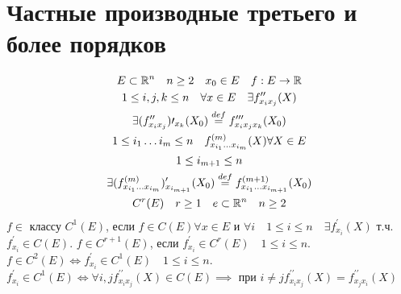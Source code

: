 \documentclass[main]{subfiles}
\begin{document}
\section{Частные производные третьего и более порядков}
\begin{gather*}
    E \subset \mathbb{R}^n \quad n \geq 2 \quad x_0 \in E \quad f: E \rightarrow \mathbb{R} \\
    1 \leq i,j,k \leq n \quad \forall x \in E \quad \exists f^{\prime\prime}_{x_ix_j}(X) \\
    \exists (f^{\prime\prime}_{x_ix_j})\prime_{x_k}(X_0) \stackrel{def}{=} f^{\prime\prime\prime}_{x_ix_jx_k}(X_0) \\
    1 \leq i_1 \ldots i_m \leq n \quad f^{(m)}_{x_{i_1}\ldots x_{i_m}}(X) \forall X \in E \\
    1 \leq i_{m+1} \leq n \\
    \exists (f^{(m)}_{x_{i_1} \ldots x_{i_m}})^{\prime}_{x_{i_{m+1}}}(X_0) \stackrel{def}{=} f^{(m+1)}_{x_{i_1} \ldots x_{i_{m+1}}}(X_0) \\
    C^r(E) \quad r \geq 1 \quad e \subset \mathbb{R}^n \quad n \geq 2 
\end{gather*}
    $f \in$ классу $C^1(E)$, если $f \in C(E) \forall x \in E$ и $\forall i \quad 1 \leq i \leq n \quad
    \exists f^{\prime}_{x_i}(X)$ т.ч. $f^\prime_{x_i} \in C(E)$. $f \in C^{r+1}(E)$, если $f^\prime_{x_i} \in C^r(E) \quad 1 \leq i \leq n$.
    $f \in C^2(E) \Leftrightarrow f^\prime_{x_i} \in C^1(E) \quad 1 \leq i \leq n$. $f^\prime_{x_i} \in C^1(E) \Leftrightarrow
    \forall i, j f^{\prime\prime}_{x_i x_j}(X) \in C(E) \implies$ при $i \ne j f^{\prime\prime}_{x_ix_j}(X) = f^{\prime\prime}_{x_jx_i}(X)$
\end{document}
